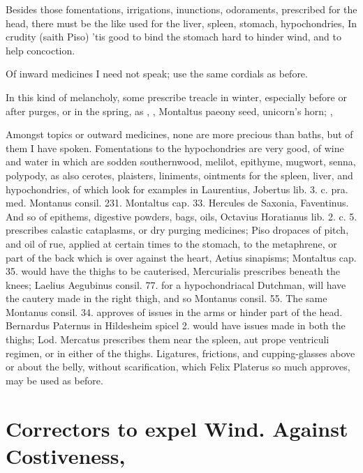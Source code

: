 Besides those fomentations, irrigations, inunctions, odoraments,
prescribed for the head, there must be the like used for the liver,
spleen, stomach, hypochondries, \etc{} In crudity (saith Piso) 'tis
good to bind the stomach hard to hinder wind, and to help concoction.

Of inward medicines I need not speak; use the same cordials as before.

In this kind of melancholy, some prescribe treacle in winter,
especially before or after purges, or in the spring, as \Avicenna{},
 , Montaltus paeony seed, unicorn's
horn; , \etc{}

Amongst topics or outward medicines, none are more precious than baths,
but of them I have spoken. Fomentations to the hypochondries are very
good, of wine and water in which are sodden southernwood, melilot,
epithyme, mugwort, senna, polypody, as also cerotes,
plaisters, liniments, ointments for the spleen, liver, and
hypochondries, of which look for examples in Laurentius, Jobertus lib.
3. c. pra. med. Montanus consil. 231. Montaltus cap. 33. Hercules de
Saxonia, Faventinus. And so of epithems, digestive powders, bags, oils,
Octavius Horatianus lib. 2. c. 5. prescribes calastic cataplasms, or
dry purging medicines; Piso dropaces of pitch, and oil of rue,
applied at certain times to the stomach, to the metaphrene, or part of
the back which is over against the heart, Aetius sinapisms; Montaltus
cap. 35. would have the thighs to be cauterised, Mercurialis
prescribes beneath the knees; Laelius Aegubinus consil. 77. for a
hypochondriacal Dutchman, will have the cautery made in the right
thigh, and so Montanus consil. 55. The same Montanus consil. 34.
approves of issues in the arms or hinder part of the head. Bernardus
Paternus in Hildesheim spicel 2. would have  issues made in both
the thighs; Lod. Mercatus prescribes them near the spleen, aut
prope ventriculi regimen, or in either of the thighs. Ligatures,
frictions, and cupping-glasses above or about the belly, without
scarification, which Felix Platerus so much approves, may be used
as before.

\section[To expel Wind. Against Constipation]{Correctors to expel Wind. Against Costiveness, \etc{}}

